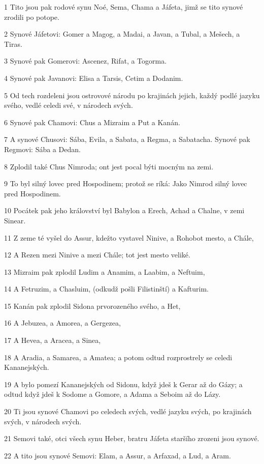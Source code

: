 \par 1 Tito jsou pak rodové synu Noé, Sema, Chama a Jáfeta, jimž se tito synové zrodili po potope.
\par 2 Synové Jáfetovi: Gomer a Magog, a Madai, a Javan, a Tubal, a Mešech, a Tiras.
\par 3 Synové pak Gomerovi: Ascenez, Rifat, a Togorma.
\par 4 Synové pak Javanovi: Elisa a Tarsis, Cetim a Dodanim.
\par 5 Od tech rozdeleni jsou ostrovové národu po krajinách jejich, každý podlé jazyku svého, vedlé celedi své, v národech svých.
\par 6 Synové pak Chamovi: Chus a Mizraim a Put a Kanán.
\par 7 A synové Chusovi: Sába, Evila, a Sabata, a Regma, a Sabatacha. Synové pak Regmovi: Sába a Dedan.
\par 8 Zplodil také Chus Nimroda; ont jest pocal býti mocným na zemi.
\par 9 To byl silný lovec pred Hospodinem; protož se ríká: Jako Nimrod silný lovec pred Hospodinem.
\par 10 Pocátek pak jeho království byl Babylon a Erech, Achad a Chalne, v zemi Sinear.
\par 11 Z zeme té vyšel do Assur, kdežto vystavel Ninive, a Rohobot mesto, a Chále,
\par 12 A Rezen mezi Ninive a mezi Chále; tot jest mesto veliké.
\par 13 Mizraim pak zplodil Ludim a Anamim, a Laabim, a Neftuim,
\par 14 A Fetruzim, a Chasluim, (odkudž pošli Filistinští) a Kafturim.
\par 15 Kanán pak zplodil Sidona prvorozeného svého, a Het,
\par 16 A Jebuzea, a Amorea, a Gergezea,
\par 17 A Hevea, a Aracea, a Sinea,
\par 18 A Aradia, a Samarea, a Amatea; a potom odtud rozprostrely se celedi Kananejských.
\par 19 A bylo pomezí Kananejských od Sidonu, když jdeš k Gerar až do Gázy; a odtud když jdeš k Sodome a Gomore, a Adama a Seboim až do Lázy.
\par 20 Ti jsou synové Chamovi po celedech svých, vedlé jazyku svých, po krajinách svých, v národech svých.
\par 21 Semovi také, otci všech synu Heber, bratru Jáfeta staršího zrozeni jsou synové.
\par 22 A tito jsou synové Semovi: Elam, a Assur, a Arfaxad, a Lud, a Aram.
